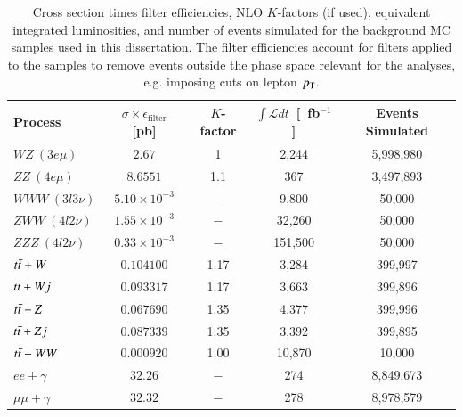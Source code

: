 \begin{table}[htb]
	\centering
	\begin{tabular}{|l|c|c|c|c| }
		\hline
		Process   & $\sigma\times\epsilon_{\mathrm{filter}}$ [pb] & $K$-factor & $\int\mathcal{L}dt$~[~fb$^{-1}$]	&	Events Simulated \\ 
		\hline
		$WZ~(3e\mu)$	& $2.67$				& 1 	& 2,244		&	5,998,980 \\
		$ZZ~(4e\mu)$	& $8.6551$				& 1.1 	& 367 		&	3,497,893 \\

		$WWW~(3l3\nu)$ 	& $5.10\times 10^{-3}$ 	& $-$ 	& 9,800		&	50,000 \\
		$ZWW~(4l2\nu)$  & $1.55\times 10^{-3}$ 	& $-$ 	& 32,260	&	50,000 \\
		$ZZZ~(4l2\nu)$  & $0.33\times 10^{-3}$ 	& $-$ 	& 151,500	&	50,000 \\

		$t\bar{t}+W$		& $0.104100$			& 1.17	& 3,284		&	399,997	\\
		$t\bar{t}+Wj$		& $0.093317$			& 1.17	& 3,663		&	399,896	\\
		$t\bar{t}+Z$		& $0.067690$			& 1.35	& 4,377		&	399,996	\\
		$t\bar{t}+Zj$		& $0.087339$			& 1.35	& 3,392		&	399,895	\\
		$t\bar{t}+WW$		& $0.000920$			& 1.00	& 10,870	&	10,000	\\

		$ee+\gamma$ 	& $32.26$ 				& $-$ 	& 274 		&	8,849,673\\
		$\mu\mu+\gamma$ & $32.32$ 				& $-$ 	& 278		&	8,978,579 \\
		\hline
	\end{tabular}
	\caption{Cross section times filter efficiencies, NLO $K$-factors (if used), equivalent integrated luminosities, and number of events simulated for the background MC samples used in this dissertation. The filter efficiencies account for filters applied to the samples to remove events outside the phase space relevant for the analyses, e.g. imposing cuts on lepton $p_{\text{T}}$. }
	\label{table:mc-cross-sections}
\end{table}


